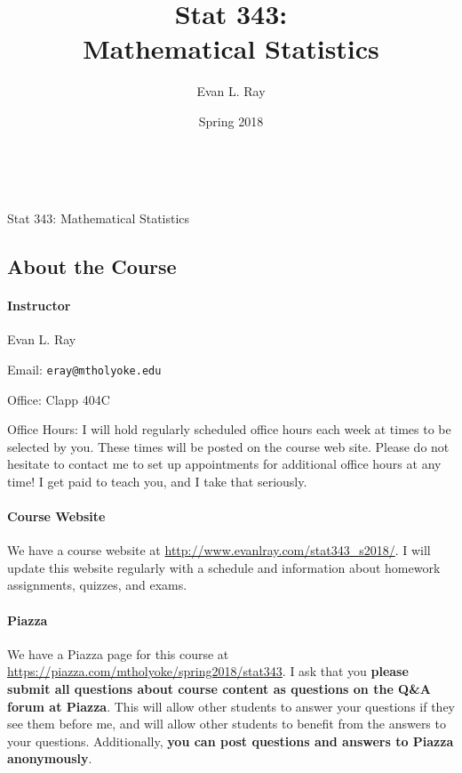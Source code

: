 \documentclass[11pt]{article}
\title{Stat 343:\\Mathematical Statistics}
\author{Evan L. Ray}
\date{Spring 2018}
\begin{document}

\ \\
\vspace{.01in}
\begin{center}
{\large Stat 343: Mathematical Statistics}
\end{center}
\subsection*{About the Course}

\paragraph{Instructor}

Evan L. Ray

Email: \texttt{eray@mtholyoke.edu}

Office: Clapp 404C

Office Hours: I will hold regularly scheduled office hours each week at times to be selected by you.  These times will be posted on the course web site.  Please do not hesitate to contact me to set up appointments for additional office hours at any time!  I get paid to teach you, and I take that seriously.

\paragraph{Course Website}

We have a course website at \url{http://www.evanlray.com/stat343_s2018/}.  I will update this website regularly with a schedule and information about homework assignments, quizzes, and exams.

\paragraph{Piazza}

We have a Piazza page for this course at \url{https://piazza.com/mtholyoke/spring2018/stat343}.  I ask that you \textbf{please submit all questions about course content as questions on the Q{\&}A forum at Piazza}.  This will allow other students to answer your questions if they see them before me, and will allow other students to benefit from the answers to your questions.  Additionally, \textbf{you can post questions and answers to Piazza anonymously}.
\end{document}
